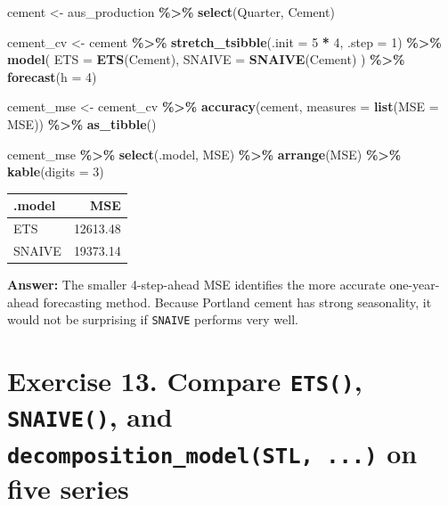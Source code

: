 \documentclass[
  11pt,
]{article}
\newenvironment{Shaded}{\begin{snugshade}}{\end{snugshade}}
\newcommand{\AttributeTok}[1]{\textcolor[rgb]{0.13,0.29,0.53}{#1}}
\newcommand{\DecValTok}[1]{\textcolor[rgb]{0.00,0.00,0.81}{#1}}
\newcommand{\FunctionTok}[1]{\textcolor[rgb]{0.13,0.29,0.53}{\textbf{#1}}}
\newcommand{\NormalTok}[1]{#1}
\newcommand{\OtherTok}[1]{\textcolor[rgb]{0.56,0.35,0.01}{#1}}
\newcommand{\SpecialCharTok}[1]{\textcolor[rgb]{0.81,0.36,0.00}{\textbf{#1}}}
\newcounter{none} %
\begin{document}
\begin{Shaded}
\begin{Highlighting}[]
\NormalTok{cement }\OtherTok{\textless{}{-}}\NormalTok{ aus\_production }\SpecialCharTok{\%\textgreater{}\%} \FunctionTok{select}\NormalTok{(Quarter, Cement)}

\NormalTok{cement\_cv }\OtherTok{\textless{}{-}}\NormalTok{ cement }\SpecialCharTok{\%\textgreater{}\%}
  \FunctionTok{stretch\_tsibble}\NormalTok{(}\AttributeTok{.init =} \DecValTok{5} \SpecialCharTok{*} \DecValTok{4}\NormalTok{, }\AttributeTok{.step =} \DecValTok{1}\NormalTok{) }\SpecialCharTok{\%\textgreater{}\%}
  \FunctionTok{model}\NormalTok{(}
    \AttributeTok{ETS =} \FunctionTok{ETS}\NormalTok{(Cement),}
    \AttributeTok{SNAIVE =} \FunctionTok{SNAIVE}\NormalTok{(Cement)}
\NormalTok{  ) }\SpecialCharTok{\%\textgreater{}\%}
  \FunctionTok{forecast}\NormalTok{(}\AttributeTok{h =} \DecValTok{4}\NormalTok{)}

\NormalTok{cement\_mse }\OtherTok{\textless{}{-}}\NormalTok{ cement\_cv }\SpecialCharTok{\%\textgreater{}\%}
  \FunctionTok{accuracy}\NormalTok{(cement, }\AttributeTok{measures =} \FunctionTok{list}\NormalTok{(}\AttributeTok{MSE =}\NormalTok{ MSE)) }\SpecialCharTok{\%\textgreater{}\%}
  \FunctionTok{as\_tibble}\NormalTok{()}

\NormalTok{cement\_mse }\SpecialCharTok{\%\textgreater{}\%}
  \FunctionTok{select}\NormalTok{(.model, MSE) }\SpecialCharTok{\%\textgreater{}\%}
  \FunctionTok{arrange}\NormalTok{(MSE) }\SpecialCharTok{\%\textgreater{}\%}
  \FunctionTok{kable}\NormalTok{(}\AttributeTok{digits =} \DecValTok{3}\NormalTok{)}
\end{Highlighting}
\end{Shaded}

{\def\LTcaptype{none} %
\begin{longtable}[]{@{}lr@{}}
\toprule\noalign{}
.model & MSE \\
\midrule\noalign{}
\endhead
\bottomrule\noalign{}
\endlastfoot
ETS & 12613.48 \\
SNAIVE & 19373.14 \\
\end{longtable}
}

\textbf{Answer:} The smaller 4-step-ahead MSE identifies the more
accurate one-year-ahead forecasting method. Because Portland cement has
strong seasonality, it would not be surprising if \texttt{SNAIVE}
performs very well.

\section{\texorpdfstring{Exercise 13. Compare \texttt{ETS()},
\texttt{SNAIVE()}, and \texttt{decomposition\_model(STL,\ ...)} on five
series}{Exercise 13. Compare ETS(), SNAIVE(), and decomposition\_model(STL, ...) on five series}}\label{exercise-13.-compare-ets-snaive-and-decomposition_modelstl-...-on-five-series}
\end{document}
